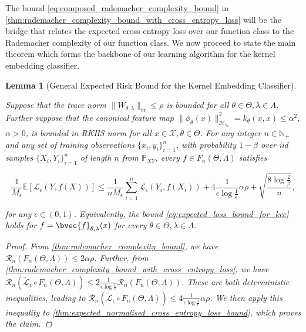 \documentclass{article}
\newtheorem{lemma}[theorem]{Lemma}
\begin{document}
		The bound \eqref{eq:composed_rademacher_complexity_bound} in \cref{thm:rademacher_complexity_bound_with_cross_entropy_loss} will be the bridge that relates the expected cross entropy loss over our function class to the Rademacher complexity of our function class. We now proceed to state the main theorem which forms the backbone of our learning algorithm for the kernel embedding classifier.
		
		\begin{lemma}[General Expected Risk Bound for the Kernel Embedding Classifier]
			\label{thm:expected_loss_bound_for_kec}
			
			Suppose that the trace norm $\| W_{\theta, \lambda} \|_{\mathrm{tr}} \leq \rho$ is bounded for all $\theta \in \Theta, \lambda \in \Lambda$. Further suppose that the canonical feature map $\| \phi_{\theta}(x) \|_{\mathcal{H}_{k_{\theta}}}^{2} = k_{\theta}(x, x) \leq \alpha^{2}$, $\alpha > 0$, is bounded in RKHS norm for all $x \in \mathcal{X}, \theta \in \Theta$. For any integer $n \in \mathbb{N}_{+}$ and any set of training observations $\{x_{i}, y_{i}\}_{i = 1}^{n}$, with probability $1 - \beta$ over \textit{iid} samples $\{X_{i}, Y_{i}\}_{i = 1}^{n}$ of length $n$ from $\mathbb{P}_{X Y}$, every $f \in F_{n}(\Theta, \Lambda)$ satisfies
			
			\begin{equation}
				\frac{1}{M_{\epsilon}} \mathbb{E}[\mathcal{L}_{\epsilon}(Y, f(X))] \leq \frac{1}{n M_{\epsilon}} \sum_{i = 1}^{n} \mathcal{L}_{\epsilon}(Y_{i}, f(X_{i})) + 4 \frac{1}{\epsilon \log{\frac{1}{\epsilon}}} \alpha \rho + \sqrt{\frac{8 \log{\frac{2}{\beta}}}{n}},
			\label{eq:expected_loss_bound_for_kec}
			\end{equation}
			
			for any $\epsilon \in (0, 1)$. Equivalently, the bound \eqref{eq:expected_loss_bound_for_kec} holds for $f = \bvec{f}_{\theta, \lambda}(x)$ for every $\theta \in \Theta, \lambda \in \Lambda$.
	
			\begin{proof}
				From \cref{thm:rademacher_complexity_bound}, we have $\mathcal{R}_{n}(F_{n}(\Theta, \Lambda)) \leq 2 \alpha \rho$. Further, from \cref{thm:rademacher_complexity_bound_with_cross_entropy_loss}, we have $\mathcal{R}_{n}(\tilde{\mathcal{L}}_{\epsilon} \circ F_{n}(\Theta, \Lambda)) \leq 2 \frac{1}{\epsilon \log{\frac{1}{\epsilon}}} \mathcal{R}_{n}(F_{n}(\Theta, \Lambda))$. These are both deterministic inequalities, leading to $\mathcal{R}_{n}(\tilde{\mathcal{L}}_{\epsilon} \circ F_{n}(\Theta, \Lambda)) \leq 4 \frac{1}{\epsilon \log{\frac{1}{\epsilon}}} \alpha \rho$. We then apply this inequality to \cref{thm:expected_normalised_cross_entropy_loss_bound}, which proves the claim.

			\end{proof}
		\end{lemma}
\end{document}
